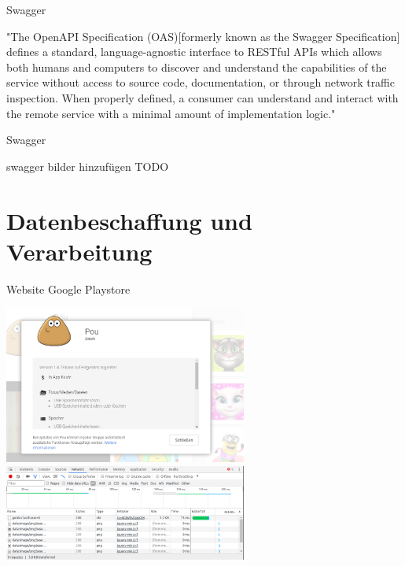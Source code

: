 \documentclass[compress,t]{beamer}
\begin{document}
\begin {frame}{Swagger}

    \begin{center}
         "The OpenAPI Specification (OAS)[formerly known as the Swagger Specification] defines a standard, language-agnostic interface to RESTful APIs which allows both humans and computers to discover and understand the capabilities of the service without access to source code, documentation, or through network traffic inspection. When properly defined, a consumer can understand and interact with the remote service with a minimal amount of implementation logic."

    \end{center}

\end{frame}

\begin {frame}{Swagger}

    \begin{center}
         swagger bilder hinzufügen TODO

    \end{center}

\end{frame}

\section{Datenbeschaffung und Verarbeitung}

\begin{frame}{Website Google Playstore}

    \begin{center}
        \includegraphics[width=0.6\textwidth]{img/google_play.png}
        \newline
        \includegraphics[width=0.6\textwidth]{img/google_play_network.png}
    \end{center}

\end{frame}
\end{document}
